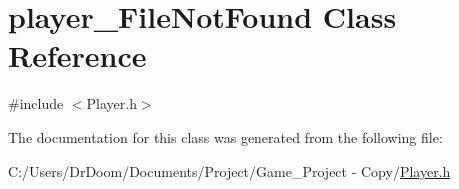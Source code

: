 \hypertarget{classplayer___file_not_found}{}\section{player\+\_\+\+File\+Not\+Found Class Reference}
\label{classplayer___file_not_found}


{\ttfamily \#include $<$Player.\+h$>$}



The documentation for this class was generated from the following file\+:\begin{DoxyCompactItemize}
\item 
C\+:/\+Users/\+Dr\+Doom/\+Documents/\+Project/\+Game\+\_\+\+Project -\/ Copy/\hyperlink{_player_8h}{Player.\+h}\end{DoxyCompactItemize}
